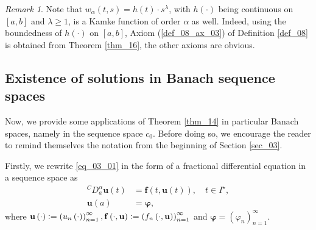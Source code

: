\documentclass[reqno]{amsart}
\numberwithin{equation}{section}
\theoremstyle{definition}
\theoremstyle{remark}
\newtheorem{remark}{Remark}
\newcommand{\axiomRef}[1]{\textrm{Axiom (\ref{#1})}}
\newcommand{\br}[1]{\left(#1\right)}
\newcommand{\bu}{\mathbf{u}}
\newcommand{\bvarphi}{\boldsymbol{\varphi}}
\newcommand{\DC}[3]{{}^{C}\!D^{#1}_{#2}{#3}}
\newcommand{\definitionRef}[1]{\textrm{Definition \ref{#1}}}
\newcommand{\defeq}{\vcentcolon=}
\newcommand{\sbr}[1]{\left[#1\right]}
\newcommand{\sectionRef}[1]{\textrm{Section \ref{#1}}}
\newcommand{\sI}{I^{\star}}
\newcommand{\theoremRef}[1]{\textrm{Theorem \ref{#1}}}
\begin{document}
	\begin{remark}\label{rem_16}
		Note that $w_{\alpha}\br{t,s}=h\br{t}\cdot{s}^{\lambda}$, with $h\br{\cdot}$ being continuous on $\sbr{a,b}$ and $\lambda\geq1$, is a Kamke function of order $\alpha$ as well. Indeed, using the boundedness of $h\br{\cdot}$ on $\sbr{a,b}$, \axiomRef{def_08_ax_03} of \definitionRef{def_08} is obtained from \theoremRef{thm_16}, the other axioms are obvious.
	\end{remark}
	
	\subsection{Existence of solutions in Banach sequence spaces}\label{sec_04_02}
	Now, we provide some applications of \theoremRef{thm_14} in particular Banach spaces, namely in the sequence space $c_0$. Before doing so, we encourage the reader to remind themselves the notation from the beginning of \sectionRef{sec_03}. 
	
	Firstly, we rewrite \eqref{eq_03_01} in the form of a fractional differential equation in a sequence space as
	\begin{subequations}\label{eq_04_08}
		\begin{align}
			\DC{\alpha}{a}{\bu\br{t}}&=\mathbf{f}\br{t,\bu\br{t}},\quad{t}\in\sI,\\
			\bu\br{a}&=\bvarphi,
		\end{align}
	\end{subequations}
	where $\bu\br{\cdot}\defeq\br{u_n\br{\cdot}}_{n=1}^{\infty},\mathbf{f}\br{\cdot,\bu}\defeq\br{f_n\br{\cdot,\bu}}_{n=1}^{\infty}$ and $\bvarphi=\br{\varphi_n}_{n=1}^{\infty}$.
	
\end{document}
